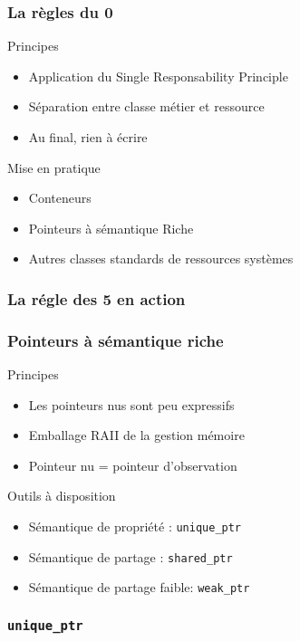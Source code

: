 \documentclass[svgnames]{beamer}
\begin{document}
\frame
{
  \frametitle{La règles du 0}
  \begin{block}{Principes}
  \begin{itemize}
  \item Application du Single Responsability Principle
  \item Séparation entre classe métier et ressource
  \item Au final, rien à écrire
  \end{itemize}
  \end{block}{}

  \begin{block}{Mise en pratique}
  \begin{itemize}
  \item Conteneurs
  \item Pointeurs à sémantique Riche
  \item Autres classes standards de ressources systèmes
  \end{itemize}
  \end{block}{}
}

\frame
{
  \frametitle{La régle des 5 en action}
}

\frame
{
  \frametitle{Pointeurs à sémantique riche}
  \begin{block}{Principes}
  \begin{itemize}
  \item Les pointeurs nus sont peu expressifs
  \item Emballage RAII de la gestion mémoire
  \item Pointeur nu = pointeur d'observation
  \end{itemize}
  \end{block}{}

  \begin{block}{Outils à disposition}
  \begin{itemize}
  \item Sémantique de propriété : \texttt{unique\_ptr}
  \item Sémantique de partage : \texttt{shared\_ptr} 
  \item Sémantique de partage faible: \texttt{weak\_ptr}
  \end{itemize}
  \end{block}{}
}

\frame
{
  \frametitle{\texttt{unique\_ptr}}
}
\end{document}
